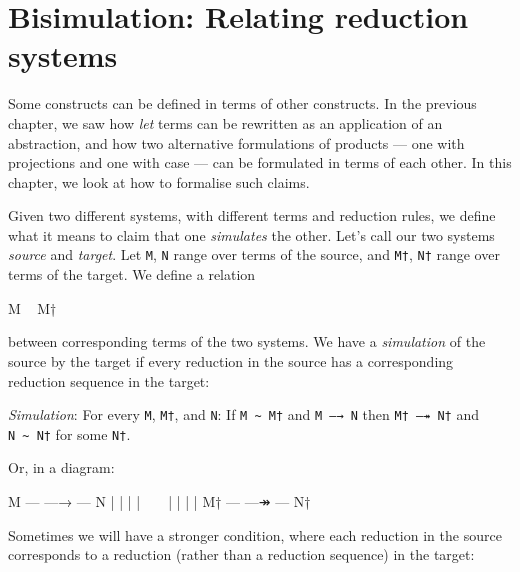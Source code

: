 \hypertarget{Bisimulation}{%
\chapter{Bisimulation: Relating reduction systems}\label{Bisimulation}}

\begin{fence}
\begin{code}%
\>[0]\AgdaSpace{}%
\AgdaSpace{}%
\<%
\end{code}
\end{fence}

Some constructs can be defined in terms of other constructs. In the
previous chapter, we saw how \emph{let} terms can be rewritten as an
application of an abstraction, and how two alternative formulations of
products --- one with projections and one with case --- can be
formulated in terms of each other. In this chapter, we look at how to
formalise such claims.

Given two different systems, with different terms and reduction rules,
we define what it means to claim that one \emph{simulates} the other.
Let's call our two systems \emph{source} and \emph{target}. Let
\texttt{M}, \texttt{N} range over terms of the source, and \texttt{M†},
\texttt{N†} range over terms of the target. We define a relation

\begin{myDisplay}
M ~ M†
\end{myDisplay}

between corresponding terms of the two systems. We have a
\emph{simulation} of the source by the target if every reduction in the
source has a corresponding reduction sequence in the target:

\emph{Simulation}: For every \texttt{M}, \texttt{M†}, and \texttt{N}: If
\texttt{M\ \textasciitilde{}\ M†} and \texttt{M\ —→\ N} then
\texttt{M†\ —↠\ N†} and \texttt{N\ \textasciitilde{}\ N†} for some
\texttt{N†}.

Or, in a diagram:

\begin{myDisplay}
M  --- —→ --- N
|             |
|             |
~             ~
|             |
|             |
M† --- —↠ --- N†
\end{myDisplay}

Sometimes we will have a stronger condition, where each reduction in the
source corresponds to a reduction (rather than a reduction sequence) in
the target:

